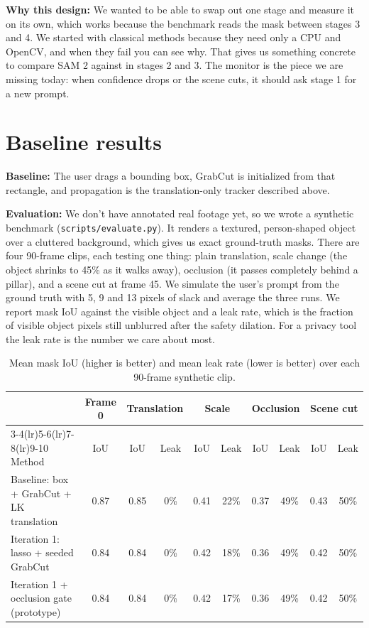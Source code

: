 \documentclass[10pt,letterpaper]{article}
\begin{document}
\textbf{Why this design:} We wanted to be able to swap out one stage and measure it on its own,
which works because the benchmark reads the mask between stages 3 and 4. We started with classical
methods because they need only a CPU and OpenCV, and when they fail you can see why. That gives us
something concrete to compare SAM 2 against in stages 2 and 3. The monitor is the piece we are
missing today: when confidence drops or the scene cuts, it should ask stage 1 for a new prompt.

\section{Baseline results}

\textbf{Baseline:} The user drags a bounding box, GrabCut is initialized from that rectangle, and
propagation is the translation-only tracker described above.

\textbf{Evaluation:} We don't have annotated real footage yet, so we wrote a synthetic benchmark
(\texttt{scripts/evaluate.py}). It renders a textured, person-shaped object over a cluttered
background, which gives us exact ground-truth masks. There are four 90-frame clips, each testing one
thing: plain translation, scale change (the object shrinks to 45\% as it walks away), occlusion (it
passes completely behind a pillar), and a scene cut at frame 45. We simulate the user's prompt from
the ground truth with 5, 9 and 13 pixels of slack and average the three runs. We report mask IoU
against the visible object and a leak rate, which is the fraction of visible object pixels still
unblurred after the safety dilation. For a privacy tool the leak rate is the number we care about
most.

\begin{table}[h]
\centering\small
\setlength{\tabcolsep}{4.5pt}
\begin{tabular}{lccccccccc}
\toprule
 & Frame 0 & \multicolumn{2}{c}{Translation} & \multicolumn{2}{c}{Scale} &
 \multicolumn{2}{c}{Occlusion} & \multicolumn{2}{c}{Scene cut} \\
\cmidrule(lr){3-4}\cmidrule(lr){5-6}\cmidrule(lr){7-8}\cmidrule(lr){9-10}
Method & IoU & IoU & Leak & IoU & Leak & IoU & Leak & IoU & Leak \\
\midrule
Baseline: box + GrabCut + LK translation   & 0.87 & 0.85 & 0\% & 0.41 & 22\% & 0.37 & 49\% & 0.43 & 50\% \\
Iteration 1: lasso + seeded GrabCut        & 0.84 & 0.84 & 0\% & 0.42 & 18\% & 0.36 & 49\% & 0.42 & 50\% \\
Iteration 1 + occlusion gate (prototype)   & 0.84 & 0.84 & 0\% & 0.42 & 17\% & 0.36 & 49\% & 0.42 & 50\% \\
\bottomrule
\end{tabular}
\caption{Mean mask IoU (higher is better) and mean leak rate (lower is better) over each
90-frame synthetic clip.}
\label{tab:results}
\end{table}
\end{document}

